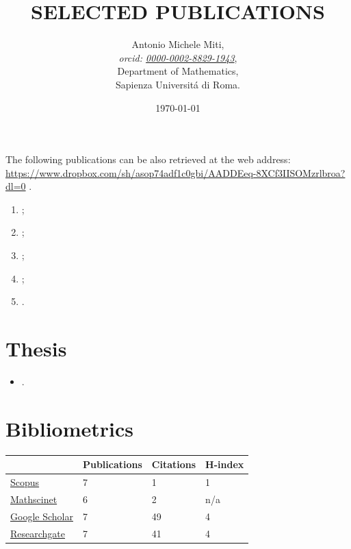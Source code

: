 \documentclass[a4paper]{article}
\title{SELECTED PUBLICATIONS}
\date{\today}
\author{
	Antonio Michele Miti,\\
	\emph{orcid: \href{https://orcid.org/0000-0002-8829-1943}{0000-0002-8829-1943}},
	\\
	Department of Mathematics,\\
	Sapienza Universit\'a di Roma.
}
\begin{document}
  

	\maketitle

	\noindent
  The following publications can be also retrieved at the web address:
  \\ 
  \url{https://www.dropbox.com/sh/asop74adf1c0gbi/AADDEeq-8XCf3IISOMzrlbroa?dl=0}
  .


	  \begin{enumerate}
    	\item {};
		\item {};		
 		\item {};
 		\item {};
 		\item {}.
	  \end{enumerate}

	\section*{Thesis}
	\begin{itemize}
		\item {}.
	\end{itemize}

	\section*{Bibliometrics}

	\begin{center}
		\begin{tabularx}{.75\linewidth}{|X|p{7em}|p{7em}|p{7em}|}
				\hline
				 & 
				 Publications & 
				 Citations &
				 H-index 
				 \\
				 \hline 
				 \href{https://www.scopus.com/authid/detail.uri?authorId=57218509273\#tab=preprints}{Scopus} & 7 & 1 & 1 
				 \\
				\href{https://mathscinet.ams.org/mathscinet/author?authorId=1435797}{Mathscinet} & 6 & 2 & n/a 
				\\
				\href{https://scholar.google.com/citations?user=DWKPuJYAAAAJ\&hl=it\&oi=ao}{Google Scholar} & 7 & 49 & 4 
				\\
				\href{https://www.researchgate.net/profile/Antonio-Michele-Miti?ev=hdr_xprf}{Researchgate} & 7 & 41 & 4 
				\\
				\hline
		\end{tabularx}
	\end{center}
\end{document}

